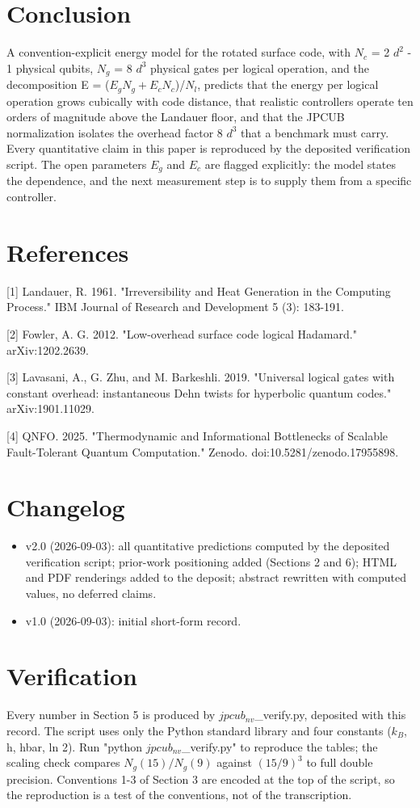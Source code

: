 \documentclass[11pt]{article}
\begin{document}
\section{Conclusion}
A convention-explicit energy model for the rotated surface code, with $N_{c}$ = 2 $d^{2}$ - 1 physical qubits, $N_{g}$ = 8 $d^{3}$ physical gates per logical operation, and the decomposition E = ($E_{g}   N_{g} + E_{c}   N_{c}$)/$N_{l}$, predicts that the energy per logical operation grows cubically with code distance, that realistic controllers operate ten orders of magnitude above the Landauer floor, and that the JPCUB normalization isolates the overhead factor 8 $d^{3}$ that a benchmark must carry. Every quantitative claim in this paper is reproduced by the deposited verification script. The open parameters $E_{g}$ and $E_{c}$ are flagged explicitly: the model states the dependence, and the next measurement step is to supply them from a specific controller.

\section*{References}
[1] Landauer, R. 1961. "Irreversibility and Heat Generation in the Computing Process." IBM Journal of Research and Development 5 (3): 183-191.

[2] Fowler, A. G. 2012. "Low-overhead surface code logical Hadamard." arXiv:1202.2639.

[3] Lavasani, A., G. Zhu, and M. Barkeshli. 2019. "Universal logical gates with constant overhead: instantaneous Dehn twists for hyperbolic quantum codes." arXiv:1901.11029.

[4] QNFO. 2025. "Thermodynamic and Informational Bottlenecks of Scalable Fault-Tolerant Quantum Computation." Zenodo. doi:10.5281/zenodo.17955898.

\section*{Changelog}
\begin{itemize}
  \item v2.0 (2026-09-03): all quantitative predictions computed by the deposited verification script; prior-work positioning added (Sections 2 and 6); HTML and PDF renderings added to the deposit; abstract rewritten with computed values, no deferred claims.
  \item v1.0 (2026-09-03): initial short-form record.
\end{itemize}
\section*{Verification}
Every number in Section 5 is produced by $jpcub_{nv}$\_verify.py, deposited with this record. The script uses only the Python standard library and four constants ($k_{B}$, h, hbar, ln 2). Run "python $jpcub_{nv}$\_verify.py" to reproduce the tables; the scaling check compares $N_{g}(15) / N_{g}(9)$ against $(15/9)^{3}$ to full double precision. Conventions 1-3 of Section 3 are encoded at the top of the script, so the reproduction is a test of the conventions, not of the transcription.
\end{document}
